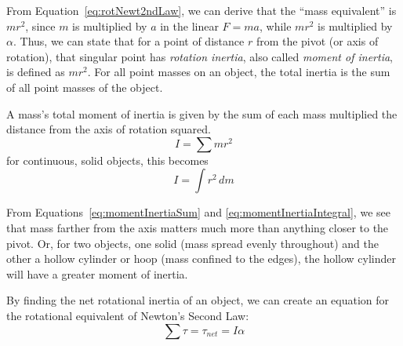 From Equation~\ref{eq:rotNewt2ndLaw}, we can derive that the ``mass equivalent'' is $mr^2$, since $m$ is multiplied by $a$ in the linear $F=ma$, while $mr^2$ is multiplied by $\alpha$. Thus, we can state that for a point of distance $r$ from the pivot (or axis of rotation), that singular point has \emph{rotation inertia}, also called \emph{moment of inertia}, is defined as $mr^2$. For all point masses on an object, the total inertia is the sum of all point masses of the object.
\begin{mdframed}[frametitle = {Moment of Inertia}, style = important]
    A mass's total moment of inertia is given by the sum of each mass multiplied the distance from the axis of rotation squared.
    \begin{equation}
        I = \sum m r^2\label{eq:momentInertiaSum}
    \end{equation}
    for continuous, solid objects, this becomes
    \begin{equation}
        I = \int r^2 \, dm \label{eq:momentInertiaIntegral}
    \end{equation}
\end{mdframed}
From Equations~\ref{eq:momentInertiaSum} and \ref{eq:momentInertiaIntegral}, we see that mass farther from the axis matters much more than anything closer to the pivot. Or, for two objects, one solid (mass spread evenly throughout) and the other a hollow cylinder or hoop (mass confined to the edges), the hollow cylinder will have a greater moment of inertia.

By finding the net rotational inertia of an object, we can create an equation for the rotational equivalent of Newton's Second Law:
\begin{equation}
    \sum \tau = \tau_{net} = I \alpha
    \label{eq:ialpha}
\end{equation}

